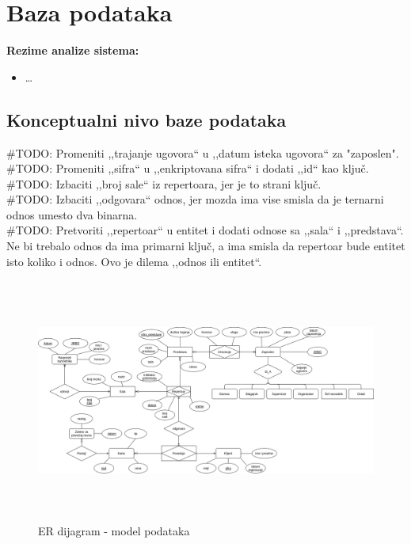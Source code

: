 \documentclass[a4paper]{article}
\begin{document}
\section{Baza podataka}

\noindent\textbf{Rezime analize sistema:}
\begin{itemize}
  \item \dots
\end{itemize}

\subsection{Konceptualni nivo baze podataka}

\noindent\#TODO: Promeniti ,,trajanje ugovora`` u ,,datum isteka ugovora`` za "zaposlen".\\
\#TODO: Promeniti ,,sifra`` u ,,enkriptovana sifra`` i dodati ,,id`` kao ključ.\\
\#TODO: Izbaciti ,,broj sale`` iz repertoara, jer je to strani ključ.\\
\#TODO: Izbaciti ,,odgovara`` odnos, jer mozda ima vise smisla da je ternarni odnos umesto dva binarna.\\
\#TODO: Pretvoriti ,,repertoar`` u entitet i dodati odnose sa ,,sala`` i ,,predstava``. Ne bi
trebalo odnos da ima primarni ključ, a ima smisla da repertoar bude entitet isto koliko i odnos. Ovo
je dilema ,,odnos ili entitet``.

\begin{figure}[H]
  \begin{center}
    \includegraphics[width=140mm,height=80mm]{../database-model/model.png}
  \end{center}
  \caption{ER dijagram - model podataka}
  \label{er_diagram_model}
\end{figure}
\end{document}
